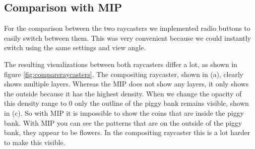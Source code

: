 \subsection{Comparison with MIP}
For the comparison between the two raycasters we implemented radio buttons to easily switch between them.
This was very convenient because we could instantly switch using the same settings and view angle.

The resulting visualizations between both raycasters differ a lot, as shown in figure \ref{fig:compareraycasters}.
The compositing raycaster, shown in (a), clearly shows multiple layers.
Whereas the MIP does not show any layers, it only shows the outside because it has the highest density.
When we change the opacity of this density range to 0 only the outline of the piggy bank remains visible, shown in (c).
So with MIP it is impossible to show the coins that are inside the piggy bank. 
With MIP you can see the patterns that are on the outside of the piggy bank, they appear to be flowers.
In the compositing raycaster this is a lot harder to make this visible.

